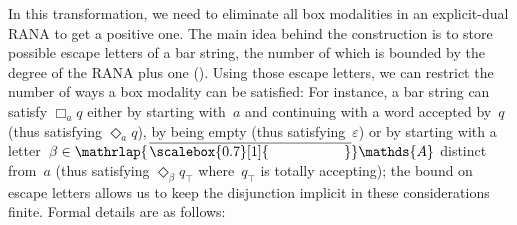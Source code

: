 \documentclass[10pt,a4paper]{amsart}
\theoremstyle{definition}
\newcommand{\At}{\mathds{A}}
\renewcommand{\epsilon}{\varepsilon}
\newcommand{\names}{\At}
\newcommand{\mybar}[3]{%
  \mathrlap{\hspace{#2}\overline{\scalebox{#1}[1]{\phantom{\ensuremath{#3}}}}}\ensuremath{#3}
}
\newcommand{\barNames}{{\mybar{0.7}{1.25pt}{\names}}}
\begin{document}
In this transformation, we need to eliminate all box modalities in an
explicit-dual RANA to get a positive one. The main idea behind the
construction is to store possible escape letters of a bar string, the
number of which is bounded by the degree of the RANA plus one
(). Using those escape letters, we can
restrict the number of ways a box modality can be satisfied: For
instance, a bar string can satisfy $\Box_a q$ either by starting
with~$a$ and continuing with a word accepted by~$q$ (thus satisfying
$\Diamond_a q$), by being empty (thus satisfying~$\epsilon$) or by
starting with a letter~$\beta\in\barNames$ distinct from~$a$ (thus
satisfying $\Diamond_\beta q_\top$ where~$q_\top$ is totally
accepting); the bound on escape letters allows us to keep the
disjunction implicit in these considerations finite. Formal details
are as follows:
\end{document}
